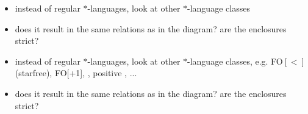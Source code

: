 \documentclass{beamer}
\begin{document}
\begin{frame}
\begin{itemize}
\item instead of regular $*$-languages, look at other $*$-language classes
\item does it result in the same relations as in the diagram? are the enclosures strict?
\end{itemize}
\end{frame}

\begin{frame}
\begin{itemize}
\item instead of regular $*$-languages, look at other $*$-language classes, e.g. FO$[<]$ (starfree), FO[+1], \PT, positive \PT, ...
\item does it result in the same relations as in the diagram? are the enclosures strict?
\end{itemize}
\end{frame}
\end{document}
